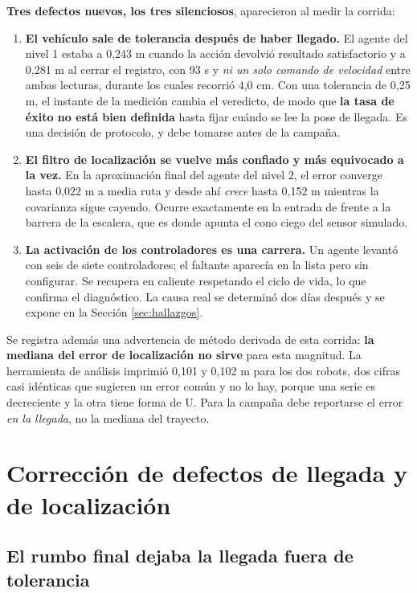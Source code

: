 \documentclass[12pt,letterpaper]{article}
\begin{document}
\textbf{Tres defectos nuevos, los tres silenciosos}, aparecieron al medir la corrida:

\begin{enumerate}
    \item \textbf{El vehículo sale de tolerancia después de haber llegado.} El agente del nivel 1 estaba a 0,243 m cuando la acción devolvió resultado satisfactorio y a 0,281 m al cerrar el registro, con 93 s y \emph{ni un solo comando de velocidad} entre ambas lecturas, durante los cuales recorrió 4,0 cm. Con una tolerancia de 0,25 m, el instante de la medición cambia el veredicto, de modo que \textbf{la tasa de éxito no está bien definida} hasta fijar cuándo se lee la pose de llegada. Es una decisión de protocolo, y debe tomarse antes de la campaña.
    \item \textbf{El filtro de localización se vuelve más confiado y más equivocado a la vez.} En la aproximación final del agente del nivel 2, el error converge hasta 0,022 m a media ruta y desde ahí \emph{crece} hasta 0,152 m mientras la covarianza sigue cayendo. Ocurre exactamente en la entrada de frente a la barrera de la escalera, que es donde apunta el cono ciego del sensor simulado.
    \item \textbf{La activación de los controladores es una carrera.} Un agente levantó con seis de siete controladores; el faltante aparecía en la lista pero sin configurar. Se recupera en caliente respetando el ciclo de vida, lo que confirma el diagnóstico. La causa real se determinó dos días después y se expone en la Sección \ref{sec:hallazgos}.
\end{enumerate}

Se registra además una advertencia de método derivada de esta corrida: \textbf{la mediana del error de localización no sirve} para esta magnitud. La herramienta de análisis imprimió 0,101 y 0,102 m para los dos robots, dos cifras casi idénticas que sugieren un error común y no lo hay, porque una serie es decreciente y la otra tiene forma de U. Para la campaña debe reportarse el error \emph{en la llegada}, no la mediana del trayecto.

\section{Corrección de defectos de llegada y de localización}
\label{sec:llegada}

\subsection{El rumbo final dejaba la llegada fuera de tolerancia}
\end{document}
